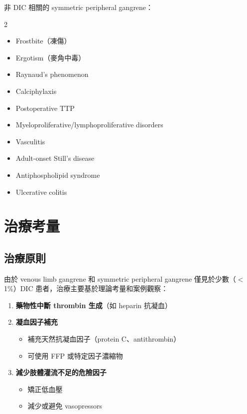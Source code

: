 \documentclass[12pt,a4paper]{article}
\begin{document}
非 DIC 相關的 symmetric peripheral gangrene：
\begin{multicols}{2}
\begin{itemize}
    \item Frostbite（凍傷）
    \item Ergotism（麥角中毒）
    \item Raynaud's phenomenon
    \item Calciphylaxis
    \item Postoperative TTP
    \item Myeloproliferative/lymphoproliferative disorders
    \item Vasculitis
    \item Adult-onset Still's disease
    \item Antiphospholipid syndrome
    \item Ulcerative colitis
\end{itemize}
\end{multicols}

\section{治療考量}

\subsection{治療原則}

由於 venous limb gangrene 和 symmetric peripheral gangrene 僅見於少數（$<$1\%）DIC 患者，治療主要基於理論考量和案例觀察：

\begin{enumerate}
    \item \textbf{藥物性中斷 thrombin 生成}（如 heparin 抗凝血）
    \item \textbf{凝血因子補充}
    \begin{itemize}
        \item 補充天然抗凝血因子（protein C、antithrombin）
        \item 可使用 FFP 或特定因子濃縮物
    \end{itemize}
    \item \textbf{減少肢體灌流不足的危險因子}
    \begin{itemize}
        \item 矯正低血壓
        \item 減少或避免 vasopressors
    \end{itemize}
\end{enumerate}
\end{document}
